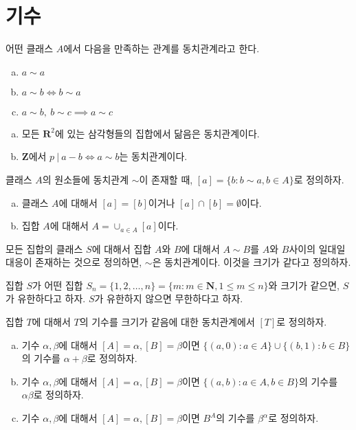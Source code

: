 \section{기수}
\begin{definition}
	어떤 클래스 $A$에서 다음을 만족하는 관계를 동치관계라고 한다.
	\begin{enumerate}[(a)]
		\item $a \sim a$
		\item $a \sim b \iff b \sim a$
		\item $a \sim b,\: b \sim c \implies a \sim c$
	\end{enumerate}
\end{definition}
\begin{example}
	\begin{enumerate}[(a)]
		\item 모든 $\mathbf{R}^2$에 있는 삼각형들의 집합에서 닮음은 동치관계이다.
		\item $\mathbf{Z}$에서 $p\:|\:a - b \iff a \sim b$는 동치관계이다.
	\end{enumerate}
\end{example}
\begin{definition}
	클래스 $A$의 원소들에 동치관계 $\sim$이 존재할 때, $[a] = \{b : b \sim a, b \in A\}$로 정의하자.
\end{definition}
\begin{theorem}
	\begin{enumerate}[(a)]
		\item 클래스 $A$에 대해서 $[a] = [b]$이거나 $[a] \cap [b] = \emptyset$이다.
		\item 집합 $A$에 대해서 $A = \cup_{a \in A}[a]$이다.
	\end{enumerate}
\end{theorem}
\begin{theorem}
	모든 집합의 클래스 $S$에 대해서 집합 $A$와 $B$에 대해서 $A \sim B$를 $A$와 $B$사이의
	일대일 대응이 존재하는 것으로 정의하면, $\sim$은 동치관계이다.
	이것을 크기가 같다고 정의하자.
\end{theorem}
\begin{definition}
	집합 $S$가 어떤 집합 $S_n = \{1, 2, \dots, n\} = \{m : m \in \mathbf{N}, 1 \leq m \leq n\}$와 크기가 같으면, $S$가 유한하다고 하자.
	$S$가 유한하지 않으면 무한하다고 하자.
\end{definition}
\begin{definition}
	집합 $T$에 대해서 $T$의 기수를 크기가 같음에 대한 동치관계에서 $[T]$로 정의하자.
	\begin{enumerate}[(a)]
		\item 기수 $\alpha, \beta$에 대해서 $[A] = \alpha, [B] = \beta$이면 $\{(a, 0) : a \in A\} \cup \{(b, 1) : b \in B\}$의 기수를
		$\alpha + \beta$로 정의하자.
		\item 기수 $\alpha, \beta$에 대해서 $[A] = \alpha, [B] = \beta$이면 $\{(a, b) : a \in A, b \in B\}$의 기수를 $\alpha\beta$로 정의하자.
		\item 기수 $\alpha, \beta$에 대해서 $[A] = \alpha, [B] = \beta$이면 $B^A$의 기수를 $\beta^\alpha$로 정의하자.
	\end{enumerate}
\end{definition}
